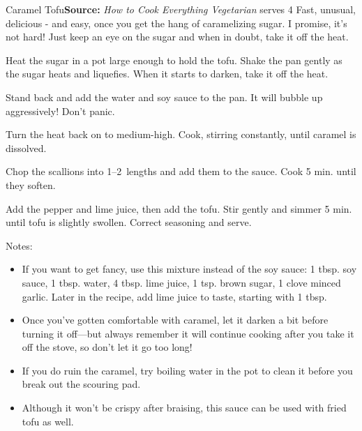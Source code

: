 \begin{recipe}{Caramel Tofu}{}{\textbf{Source:} \textit{How to Cook Everything Vegetarian} \hfill serves 4}
  \freeform Fast, unusual, delicious - and easy, once you get the hang of caramelizing sugar. I promise, it's not hard! Just keep an eye on the sugar and when in doubt, take it off the heat.

Heat the sugar in a pot large enough to hold the tofu. Shake the pan gently as the sugar heats and liquefies. When it starts to darken, take it off the heat.

Stand back and add the water and soy sauce to the pan. It will bubble up aggressively! Don't panic.

\newstep Turn the heat back on to medium-high. Cook, stirring constantly, until caramel is dissolved.

Chop the scallions into 1--2\inch\ lengths and add them to the sauce. Cook 5 min. until they soften.

Add the pepper and lime juice, then add the tofu. Stir gently and simmer 5 min. until tofu is slightly swollen. Correct seasoning and serve.

\freeform Notes:
\begin{itemize}
  \item If you want to get fancy, use this mixture instead of the soy sauce: 1 tbsp. soy sauce, 1 tbsp. water, 4 tbsp. lime juice, 1 tsp. brown sugar, 1 clove minced garlic. Later in the recipe, add lime juice to taste, starting with 1 tbsp.
  \item Once you've gotten comfortable with caramel, let it darken a bit before turning it off---but always remember it will continue cooking after you take it off the stove, so don't let it go too long!
  \item If you do ruin the caramel, try boiling water in the pot to clean it before you break out the scouring pad.
  \item Although it won't be crispy after braising, this sauce can be used with fried tofu as well.
\end{itemize}
\end{recipe}